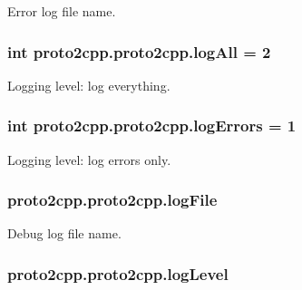 Error log file name. 

\subsubsection[{\texorpdfstring{log\+All}{logAll}}]{\setlength{\rightskip}{0pt plus 5cm}int proto2cpp.\+proto2cpp.\+log\+All = 2\hspace{0.3cm}{\ttfamily [static]}}\hypertarget{classproto2cpp_1_1proto2cpp_a0608421165933b9b58e98ac02bbc6141}{}\label{classproto2cpp_1_1proto2cpp_a0608421165933b9b58e98ac02bbc6141}


Logging level\+: log everything. 

\subsubsection[{\texorpdfstring{log\+Errors}{logErrors}}]{\setlength{\rightskip}{0pt plus 5cm}int proto2cpp.\+proto2cpp.\+log\+Errors = 1\hspace{0.3cm}{\ttfamily [static]}}\hypertarget{classproto2cpp_1_1proto2cpp_ad88c9b4f3034ecbebc9980aa0d0de616}{}\label{classproto2cpp_1_1proto2cpp_ad88c9b4f3034ecbebc9980aa0d0de616}


Logging level\+: log errors only. 

\subsubsection[{\texorpdfstring{log\+File}{logFile}}]{\setlength{\rightskip}{0pt plus 5cm}proto2cpp.\+proto2cpp.\+log\+File}\hypertarget{classproto2cpp_1_1proto2cpp_a06614bc26f0849809d3bf6b5092f8f9c}{}\label{classproto2cpp_1_1proto2cpp_a06614bc26f0849809d3bf6b5092f8f9c}


Debug log file name. 

\subsubsection[{\texorpdfstring{log\+Level}{logLevel}}]{\setlength{\rightskip}{0pt plus 5cm}proto2cpp.\+proto2cpp.\+log\+Level}\hypertarget{classproto2cpp_1_1proto2cpp_a56767af005e7589efa89611e979ebd34}{}\label{classproto2cpp_1_1proto2cpp_a56767af005e7589efa89611e979ebd34}


